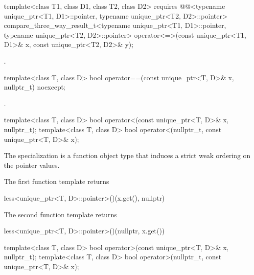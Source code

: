 %
\begin{itemdecl}
template<class T1, class D1, class T2, class D2>
  requires @@<typename unique_ptr<T1, D1>::pointer,
                                     typename unique_ptr<T2, D2>::pointer>
  compare_three_way_result_t<typename unique_ptr<T1, D1>::pointer,
                             typename unique_ptr<T2, D2>::pointer>
    operator<=>(const unique_ptr<T1, D1>& x, const unique_ptr<T2, D2>& y);
\end{itemdecl}

\begin{itemdescr}
\pnum
\returns
{}.
\end{itemdescr}

%
\begin{itemdecl}
template<class T, class D>
  bool operator==(const unique_ptr<T, D>& x, nullptr_t) noexcept;
\end{itemdecl}

\begin{itemdescr}
\pnum
\returns
{}.
\end{itemdescr}

%
\begin{itemdecl}
template<class T, class D>
  bool operator<(const unique_ptr<T, D>& x, nullptr_t);
template<class T, class D>
  bool operator<(nullptr_t, const unique_ptr<T, D>& x);
\end{itemdecl}

\begin{itemdescr}
\pnum
\expects
The specialization  is
a function object type that induces a strict weak
ordering on the pointer values.

\pnum
\returns
The first function template returns
\begin{codeblock}
less<unique_ptr<T, D>::pointer>()(x.get(), nullptr)
\end{codeblock}
The second function template returns
\begin{codeblock}
less<unique_ptr<T, D>::pointer>()(nullptr, x.get())
\end{codeblock}
\end{itemdescr}

%
\begin{itemdecl}
template<class T, class D>
  bool operator>(const unique_ptr<T, D>& x, nullptr_t);
template<class T, class D>
  bool operator>(nullptr_t, const unique_ptr<T, D>& x);
\end{itemdecl}

